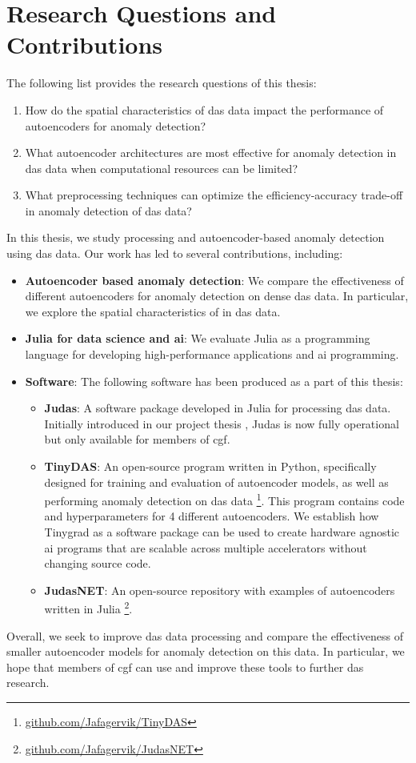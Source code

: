 \section{Research Questions and Contributions}
\label{intro:contribs}

The following list provides the research questions of this thesis: 

\begin{enumerate}
    \item How do the spatial characteristics of \acrshort{das} data impact the performance of autoencoders for anomaly detection?
    \item What autoencoder architectures are most effective for anomaly detection in \acrshort{das} data when computational resources can be limited?
    \item What preprocessing techniques can optimize the efficiency-accuracy trade-off in anomaly detection of \acrshort{das} data?
\end{enumerate}

In this thesis, we study processing and autoencoder-based anomaly detection using \acrshort{das} data. Our work has led to several contributions, including:

\begin{itemize}
    \item \textbf{Autoencoder based anomaly detection}: We compare the effectiveness of different autoencoders for anomaly detection on dense \acrshort{das} data. In particular, we explore the spatial characteristics of in \acrshort{das} data.
    \item \textbf{Julia for data science and \acrshort{ai}}: We evaluate Julia as a programming language for developing high-performance applications and \acrshort{ai} programming.
    \item \textbf{Software}: The following software has been produced as a part of this thesis:
    \begin{itemize}
        \item \textbf{Judas}: A software package developed in Julia for processing \acrshort{das} data. Initially introduced in our project thesis \cite{projthesis}, Judas is now fully operational but only available for members of \acrshort{cgf}. 
        \item \textbf{TinyDAS}: An open-source program written in Python, specifically designed for training and evaluation of autoencoder models, as well as performing anomaly detection on \acrshort{das} data \footnote{\url{github.com/Jafagervik/TinyDAS}}. This program contains code and hyperparameters for 4 different autoencoders.  We establish how Tinygrad \cite{tinygrad} as a software package can be used to create hardware agnostic \acrshort{ai} programs that are scalable across multiple accelerators without changing source code. 
        \item \textbf{JudasNET}: An open-source repository with examples of autoencoders written in Julia \footnote{\url{github.com/Jafagervik/JudasNET}}.
    \end{itemize}
\end{itemize}

Overall, we seek to improve \acrshort{das} data processing and compare the effectiveness of smaller autoencoder models for anomaly detection on this data. In particular, we hope that members of \acrshort{cgf} can use and improve these tools to further \acrshort{das} research.